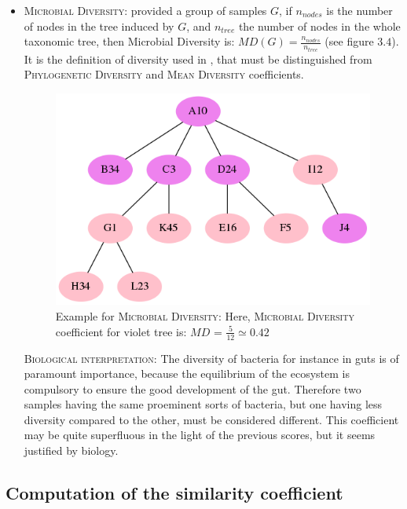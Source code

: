 \documentclass{report}
\begin{document}
\begin{itemize}
\item \textsc{Microbial Diversity:} provided a group of samples $G$, if $n_{nodes}$ is the number of nodes in the tree induced by $G$, and $n_{tree}$ the number of nodes in the whole taxonomic tree, then Microbial Diversity is: $MD(G) = \frac{n_{nodes}}{n_{tree}}$ (see figure $3.4$). It is the definition of diversity used in \cite{Enaud}, that must be distinguished from \textsc{Phylogenetic Diversity} \cite{PhyloD} and \textsc{Mean Diversity} \cite{MeanD} coefficients.

\begin{figure}[H]
\centering
\includegraphics[scale=0.5]{illustrations/diversity.png}
\caption{Example for \textsc{Microbial Diversity}: Here, \textsc{Microbial Diversity} coefficient for violet tree is: $MD$ = $\frac{5}{12} \simeq 0.42$}
\end{figure}

\bigskip

\textsc{Biological interpretation:} The diversity of bacteria for instance in guts is of paramount importance, because the equilibrium of the ecosystem is compulsory to ensure the good development of the gut. Therefore two samples having the same proeminent sorts of bacteria, but one having less diversity compared to the other, must be considered different. This coefficient may be quite superfluous in the light of the previous scores, but it seems justified by biology.

\end{itemize}

\subsection{Computation of the similarity coefficient}
\end{document}
